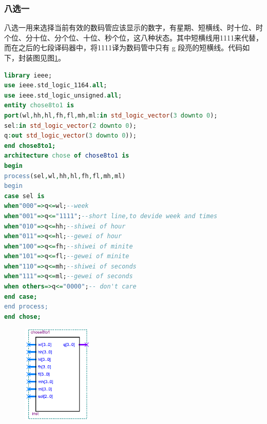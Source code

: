 \documentclass[12pt]{article}
\begin{document}
\subsubsection{八选一}八选一用来选择当前有效的数码管应该显示的数字，有星期、短横线、时十位、时个位、分十位、分个位、十位、秒个位，这八种状态。其中短横线用1111来代替，而在之后的七段译码器中，将1111译为数码管中只有 g 段亮的短横线。代码如下，封装图见图\ref{fig:8t1}。
\begin{lstlisting}[language=VHDL]
library ieee;
use ieee.std_logic_1164.all;
use ieee.std_logic_unsigned.all;
entity chose8to1 is
port(wl,hh,hl,fh,fl,mh,ml:in std_logic_vector(3 downto 0);
sel:in std_logic_vector(2 downto 0);
q:out std_logic_vector(3 downto 0)); 
end chose8to1;
architecture chose of chose8to1 is
begin
process(sel,wl,hh,hl,fh,fl,mh,ml)
begin
case sel is
when"000"=>q<=wl;--week
when"001"=>q<="1111";--short line,to devide week and times
when"010"=>q<=hh;--shiwei of hour
when"011"=>q<=hl;--gewei of hour
when"100"=>q<=fh;--shiwei of minite
when"101"=>q<=fl;--gewei of minite
when"110"=>q<=mh;--shiwei of seconds
when"111"=>q<=ml;--gewei of seconds
when others=>q<="0000";-- don't care
end case;
end process;
end chose;
\end{lstlisting}
\begin{figure}[hp]
	\centering  
	\includegraphics[width=0.3\textwidth]{picture/8t1.png} 
	\caption{}
	\label{fig:8t1}   
\end{figure}
\end{document}
